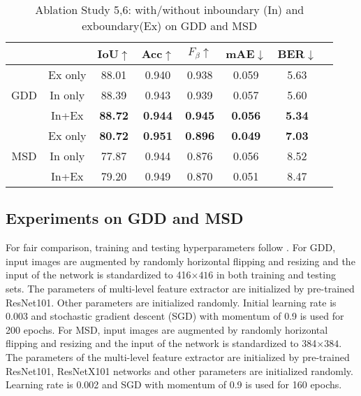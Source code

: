 \documentclass[10pt,twocolumn,letterpaper]{article}
\begin{document}
\begin{table}\scriptsize
  \centering
  \begin{tabular}{cccccccc}
    \toprule
     &&IoU$\uparrow$ & Acc$\uparrow$ &${F}_{\beta}$$\uparrow$ & mAE$\downarrow$ & BER$\downarrow$\\
    \midrule
    &Ex only  & 88.01 &0.940 &0.938 &0.059&5.63\\
    GDD&In only& 88.39 &0.943 &0.939 &0.057&5.60\\
    &In+Ex & \textbf{88.72} &\textbf{0.944}  &\textbf{0.945} &\textbf{0.056}&\textbf{5.34}\\
    \midrule
    &Ex only & \textbf{80.72} &\textbf{0.951} &\textbf{0.896} &\textbf{0.049}&\textbf{7.03}\\
    MSD&In only & 77.87 &0.944&0.876&0.056& 8.52 \\
    &In+Ex   & 79.20 &0.949&0.870&0.051&8.47\\
    \bottomrule    
  \end{tabular}
            \vspace*{-2mm}
  \caption{Ablation Study 5,6: with/without inboundary (In) and exboundary(Ex) on GDD and MSD}
            \vspace*{-4mm}
  \label{GDDabltion}
\end{table}

\subsection{Experiments on GDD and MSD}
For fair comparison, training and testing hyperparameters follow \cite{he2021enhanced}. For GDD, input images are augmented by randomly horizontal flipping and resizing and the input of the network is standardized to 416$\times{416}$ in both training and testing sets. The parameters of multi-level feature extractor are initialized by pre-trained ResNet101. Other parameters are initialized randomly. Initial learning rate is 0.003 and stochastic gradient descent (SGD) with momentum of 0.9 is used for 200 epochs.
For MSD, input images are augmented by randomly horizontal flipping and resizing and the input of the network is standardized to 384$\times{384}$. The parameters of the multi-level feature extractor are initialized by pre-trained ResNet101, ResNetX101 networks and other parameters are initialized randomly. Learning rate is 0.002 and SGD with momentum of 0.9 is used for 160 epochs.
\end{document}
